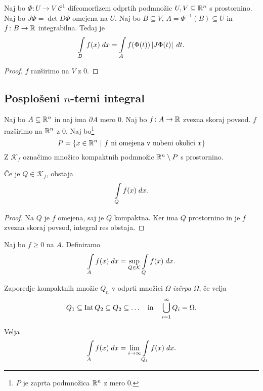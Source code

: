 \begin{posledica}
Naj bo $\Phi \colon U \to V$ $\mathcal{C}^1$ difeomorfizem odprtih
podmnožic $U, V \subseteq \mathbb{R}^n$ s prostornino. Naj bo
$J \Phi = \det D\Phi$ omejena na $U$. Naj bo $B \subseteq V$,
$A = \Phi^{-1}(B) \subseteq U$ in $f \colon B \to \mathbb{R}$ integrabilna.
Tedaj je
\[
\int\limits_B f(x)\;dx = \int\limits_A f(\Phi(t)) \left\lvert J\Phi(t)\right\rvert\;dt.
\]
\end{posledica}

\begin{proof}
$f$ razširimo na $V$ z $0$.
\end{proof}

\newpage

\subsection{Posplošeni \texorpdfstring{$n$}{n}-terni integral}

\begin{definicija}
Naj bo $A \subseteq \mathbb{R}^n$ in naj ima $\partial A$ mero $0$. Naj bo
$f \colon A \to \mathbb{R}$ zvezna skoraj povsod. $f$ razširimo na $\mathbb{R}^n$ z
$0$. Naj bo\footnote{$P$ je zaprta podmnožica $\mathbb{R}^n$ z mero $0$.}
\[
P = \left\{x \in \mathbb{R}^n~\middle\vert~\text{$f$ ni omejena v nobeni okolici $x$}\right\}
\]
Z $\mathcal{K}_f$ označimo množico kompaktnih podmnožic
$\mathbb{R}^n \setminus P$ s prostornino.
\end{definicija}

\begin{trditev}
Če je $Q \in \mathcal{K}_f$, obstaja
\[
\int\limits_Q f(x)\;dx.
\]
\end{trditev}

\begin{proof}
Na $Q$ je $f$ omejena, saj je $Q$ kompaktna. Ker ima $Q$
prostornino in je $f$ zvezna skoraj povsod, integral res obstaja.
\end{proof}

\begin{definicija}
Naj bo $f \geq 0$ na $A$. Definiramo
\[
\int\limits_A f(x)\;dx = \sup_{Q \in \mathcal{K}} \int\limits_Q f(x)\;dx.
\]
\end{definicija}

\begin{definicija}
Zaporedje kompaktnih množic $Q_n$ v odprti množici $\Omega$
\emph{izčrpa} $\Omega$, če velja
\[
Q_1 \subseteq \operatorname{Int} Q_2 \subseteq Q_2 \subseteq \dots
\quad \text{in} \quad
\bigcup_{i=1}^\infty Q_i = \Omega.
\]
\end{definicija}

\begin{trditev}
Velja
\[
\int\limits_A f(x)\;dx =
\lim_{i \to \infty} \int\limits_{Q_i} f(x)\;dx.
\]
\end{trditev}

